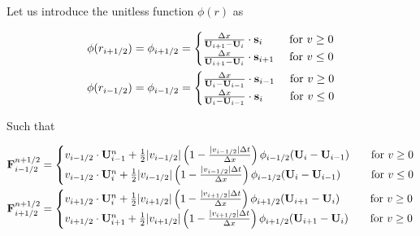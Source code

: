 Let us introduce the unitless function $\phi(r)$ as

\begin{align}
	\phi(r_{i+1/2}) &= \phi_{i+1/2} = 
		\begin{cases}
			\frac{\Delta x}{\mathbf{U}_{i+1} - \mathbf{U}_{i}} \cdot \mathbf{s}_{i} 	& 	\text{ for } v \geq 0 \\
			\frac{\Delta x}{\mathbf{U}_{i+1} - \mathbf{U}_{i}} \cdot \mathbf{s}_{i+1}	&	\text{ for } v \leq 0 \\
		\end{cases}
		\\
	\phi(r_{i-1/2}) &= \phi_{i-1/2} = 
		\begin{cases}
			\frac{\Delta x}{\mathbf{U}_i - \mathbf{U}_{i-1}} \cdot \mathbf{s}_{i-1} 	& 	\text{ for } v \geq 0 \\
			\frac{\Delta x}{\mathbf{U}_i - \mathbf{U}_{i-1}} \cdot \mathbf{s}_{i}	&	\text{ for } v \leq 0 \\
		\end{cases}
\end{align}


Such that

\begin{align*}
	\mathbf{F}_{i-1/2}^{n+1/2} &= 
		\begin{cases}
			v_{i-1/2} \cdot \mathbf{U}_{i-1}^n + \frac{1}{2} |v_{i-1/2}|  \left(1 -  \frac{|v_{i-1/2}| \Delta t}{\Delta x} \right) \phi_{i-1/2} ( \mathbf{U}_i - \mathbf{U}_{i-1} )
			 	& \quad \text{for } v \geq 0 \\
			v_{i-1/2} \cdot \mathbf{U}_{i}^n + \frac{1}{2} |v_{i-1/2}|  \left(1 -  \frac{|v_{i-1/2}| \Delta t}{\Delta x} \right) \phi_{i-1/2} ( \mathbf{U}_i - \mathbf{U}_{i-1} )
				& \quad \text{for } v \leq 0 \\
		\end{cases} \\		
	\mathbf{F}_{i+1/2}^{n+1/2} &= 
		\begin{cases}
			v_{i+1/2} \cdot \mathbf{U}_{i}^n + \frac{1}{2} |v_{i+1/2}|  \left(1 -  \frac{|v_{i+1/2}| \Delta t}{\Delta x} \right) \phi_{i+1/2} ( \mathbf{U}_{i+1} - \mathbf{U}_{i} )
			 	& \quad \text{for } v \geq 0 \\
			v_{i+1/2} \cdot \mathbf{U}_{i+1}^n + \frac{1}{2} |v_{i+1/2}|  \left(1 -  \frac{|v_{i+1/2}| \Delta t}{\Delta x} \right) \phi_{i+1/2} ( \mathbf{U}_{i+1} - \mathbf{U}_{i} )
			 	& \quad \text{for } v \geq 0 \\
		\end{cases} \\		
\end{align*}












